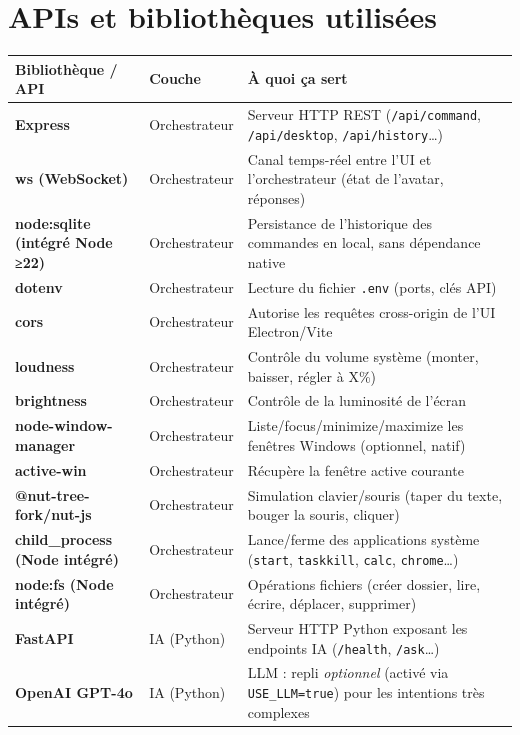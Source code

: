 \documentclass[12pt,a4paper]{article}
\begin{document}
\section{APIs et bibliothèques utilisées}

\begin{longtable}{>{\bfseries}p{4.5cm} p{2.5cm} p{7.5cm}}
\toprule
Bibliothèque / API & Couche & À quoi ça sert \\
\midrule
\endhead

Express & Orchestrateur & Serveur HTTP REST (\texttt{/api/command}, \texttt{/api/desktop}, \texttt{/api/history}…) \\
\addlinespace
ws (WebSocket) & Orchestrateur & Canal temps-réel entre l'UI et l'orchestrateur (état de l'avatar, réponses) \\
\addlinespace
node:sqlite (intégré Node ≥22) & Orchestrateur & Persistance de l'historique des commandes en local, sans dépendance native \\
\addlinespace
dotenv & Orchestrateur & Lecture du fichier \texttt{.env} (ports, clés API) \\
\addlinespace
cors & Orchestrateur & Autorise les requêtes cross-origin de l'UI Electron/Vite \\
\addlinespace
loudness & Orchestrateur & Contrôle du volume système (monter, baisser, régler à X\%) \\
\addlinespace
brightness & Orchestrateur & Contrôle de la luminosité de l'écran \\
\addlinespace
node-window-manager & Orchestrateur & Liste/focus/minimize/maximize les fenêtres Windows (optionnel, natif) \\
\addlinespace
active-win & Orchestrateur & Récupère la fenêtre active courante \\
\addlinespace
@nut-tree-fork/nut-js & Orchestrateur & Simulation clavier/souris (taper du texte, bouger la souris, cliquer) \\
\addlinespace
child\_process (Node intégré) & Orchestrateur & Lance/ferme des applications système (\texttt{start}, \texttt{taskkill}, \texttt{calc}, \texttt{chrome}…) \\
\addlinespace
node:fs (Node intégré) & Orchestrateur & Opérations fichiers (créer dossier, lire, écrire, déplacer, supprimer) \\
\addlinespace
FastAPI & IA (Python) & Serveur HTTP Python exposant les endpoints IA (\texttt{/health}, \texttt{/ask}…) \\
\addlinespace
OpenAI GPT-4o & IA (Python) & LLM : repli \emph{optionnel} (activé via \texttt{USE\_LLM=true}) pour les intentions très complexes \\

\end{longtable}
\end{document}
